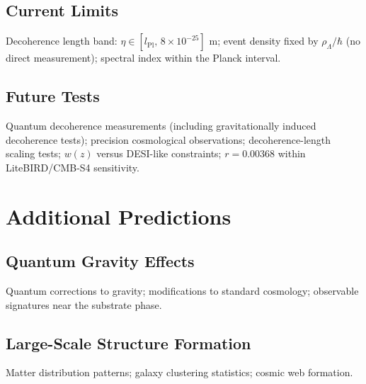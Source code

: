 \documentclass[11pt,a4paper]{article}
\begin{document}
\subsection{Current Limits}
Decoherence length band: $\eta\in[l_{\mathrm{Pl}},\,8\times10^{-25}]$ m;
event density fixed by $\rho_{\Lambda}/\hbar$ (no direct
measurement); spectral index within the Planck interval.

\subsection{Future Tests}
Quantum decoherence measurements (including gravitationally induced
decoherence tests); precision cosmological observations;
decoherence-length scaling tests; $w(z)$ versus DESI-like
constraints; $r=0.00368$ within LiteBIRD/CMB-S4 sensitivity.

\section{Additional Predictions}
\subsection{Quantum Gravity Effects}
Quantum corrections to gravity; modifications to standard
cosmology; observable signatures near the substrate phase.
\subsection{Large-Scale Structure Formation}
Matter distribution patterns; galaxy clustering statistics; cosmic
web formation.
\end{document}
